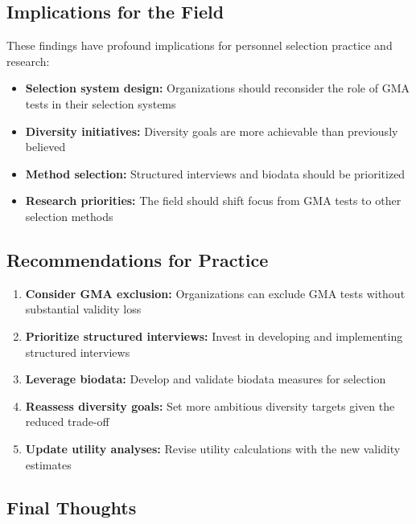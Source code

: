 \documentclass[
]{article}
\providecommand{\tightlist}{%
  \setlength{\itemsep}{0pt}\setlength{\parskip}{0pt}}
\begin{document}
\subsection{Implications for the
Field}\label{implications-for-the-field}

These findings have profound implications for personnel selection
practice and research:

\begin{itemize}
\tightlist
\item
  \textbf{Selection system design:} Organizations should reconsider the
  role of GMA tests in their selection systems
\item
  \textbf{Diversity initiatives:} Diversity goals are more achievable
  than previously believed
\item
  \textbf{Method selection:} Structured interviews and biodata should be
  prioritized
\item
  \textbf{Research priorities:} The field should shift focus from GMA
  tests to other selection methods
\end{itemize}

\subsection{Recommendations for
Practice}\label{recommendations-for-practice}

\begin{enumerate}
\def\labelenumi{\arabic{enumi}.}
\tightlist
\item
  \textbf{Consider GMA exclusion:} Organizations can exclude GMA tests
  without substantial validity loss
\item
  \textbf{Prioritize structured interviews:} Invest in developing and
  implementing structured interviews
\item
  \textbf{Leverage biodata:} Develop and validate biodata measures for
  selection
\item
  \textbf{Reassess diversity goals:} Set more ambitious diversity
  targets given the reduced trade-off
\item
  \textbf{Update utility analyses:} Revise utility calculations with the
  new validity estimates
\end{enumerate}

\subsection{Final Thoughts}\label{final-thoughts}
\end{document}
